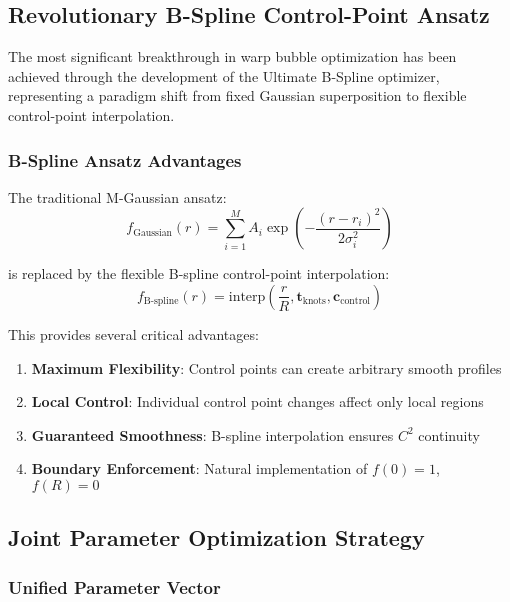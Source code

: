 \documentclass[11pt]{article}
\begin{document}
\subsection{Revolutionary B-Spline Control-Point Ansatz}

The most significant breakthrough in warp bubble optimization has been achieved through the development of the Ultimate B-Spline optimizer, representing a paradigm shift from fixed Gaussian superposition to flexible control-point interpolation.

\subsubsection{B-Spline Ansatz Advantages}

The traditional M-Gaussian ansatz:
\begin{equation}
f_{\text{Gaussian}}(r) = \sum_{i=1}^{M} A_i \exp\left(-\frac{(r-r_i)^2}{2\sigma_i^2}\right)
\end{equation}

is replaced by the flexible B-spline control-point interpolation:
\begin{equation}
f_{\text{B-spline}}(r) = \text{interp}\left(\frac{r}{R}, \mathbf{t}_{\text{knots}}, \mathbf{c}_{\text{control}}\right)
\end{equation}

This provides several critical advantages:
\begin{enumerate}
\item \textbf{Maximum Flexibility}: Control points can create arbitrary smooth profiles
\item \textbf{Local Control}: Individual control point changes affect only local regions
\item \textbf{Guaranteed Smoothness}: B-spline interpolation ensures $C^2$ continuity
\item \textbf{Boundary Enforcement}: Natural implementation of $f(0) = 1$, $f(R) = 0$
\end{enumerate}

\subsection{Joint Parameter Optimization Strategy}

\subsubsection{Unified Parameter Vector}
\end{document}
